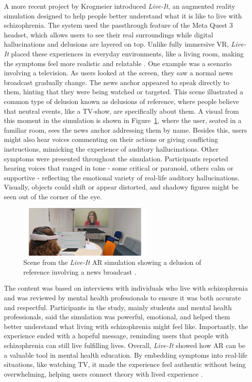 \vspace{1em}

A more recent project by Krogmeier \cite{Krogmeier2024} introduced \textit{Live-It}, an augmented reality  simulation designed to help people better understand what it is like to live with schizophrenia. The system used the passthrough feature of the Meta Quest 3 headset, which allows users to see their real surroundings while digital hallucinations and delusions are layered on top. Unlike fully immersive VR, \textit{Live-It} placed these experiences in everyday environments, like a living room, making the symptoms feel more realistic and relatable \cite{Krogmeier2024}. One example was a scenario involving a television. As users looked at the screen, they saw a normal news broadcast gradually change. The news anchor appeared to speak directly to them, hinting that they were being watched or targeted. This scene illustrated a common type of delusion known as delusions of reference, where people believe that neutral events, like a TV-show, are specifically about them.  A visual from this moment in the simulation is shown in Figure~\ref{fig:liveit_tv}, where the user, seated in a familiar room, sees the news anchor addressing them by name. Besides this, users might also hear voices commenting on their actions or giving conflicting instructions, mimicking the experience of auditory hallucinations. Other symptoms were presented throughout the simulation. Participants reported hearing voices that ranged in tone - some critical or paranoid, others calm or supportive - reflecting the emotional variety of real-life auditory hallucinations. Visually, objects could shift or appear distorted, and shadowy figures might be seen out of the corner of the eye. 

\begin{figure}[H]
  \centering
  \includegraphics[width=0.6\textwidth]{../../Figures/live-it.jpeg}
  \caption{Scene from the \textit{Live-It} AR simulation showing a delusion of reference involving a news broadcast \cite{Krogmeier2024}.}
  \label{fig:liveit_tv}
\end{figure}

The content was based on interviews with individuals who live with schizophrenia and was reviewed by mental health professionals to ensure it was both accurate and respectful. Participants in the study, mainly students and mental health professionals, said the simulation was powerful, emotional, and helped them better understand what living with schizophrenia might feel like. Importantly, the experience ended with a hopeful message, reminding users that people with schizophrenia can still live fulfilling lives. Overall, \textit{Live-It} showed how AR can be a valuable tool in mental health education. By embedding symptoms into real-life situations, like watching TV, it made the experience feel authentic without being overwhelming, helping users connect theory with lived experience \cite{Krogmeier2024}.

